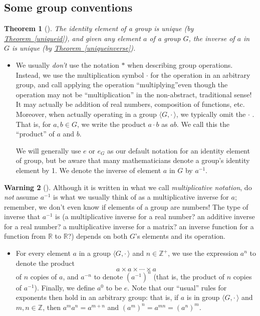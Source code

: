 \documentclass[10pt,]{book}
\theoremstyle{plain}
\newtheorem{theorem}{Theorem}[section]
\theoremstyle{definition}
\theoremstyle{definition}
\newtheorem{warning}[theorem]{Warning}
\theoremstyle{definition}
\theoremstyle{definition}
\numberwithin{equation}{section}
\def\Z{\mathbb{Z}}
\def\R{\mathbb{R}}
\def\Gdot{\langle G, \cdot\,\rangle}
\begin{document}
\subsection[{Some group conventions}]{Some group conventions}\label{subsection-1}
\begin{theorem}[{}]\label{theorem-9}
The identity element of a group is unique (by \hyperref[uniqueid]{Theorem~\ref{uniqueid}}), and given any element \(a\) of a group \(G\), the inverse of \(a\) in \(G\) is unique (by \hyperref[uniqueinverse]{Theorem~\ref{uniqueinverse}}).%
\end{theorem}
\leavevmode%
\begin{itemize}[label=\textbullet]
\item{}We usually \emph{don't} use the notation \(*\) when describing group operations. Instead, we use the multiplication symbol \(\cdot\) for the operation in an arbitrary group, and  call applying the operation ``multiplying''\textemdash{}even though the operation may not be ``multiplication'' in the non-abstract, traditional sense! It may actually be addition of real numbers, composition of functions, etc. Moreover, when actually operating in a group \(\langle G, \cdot\,\rangle\), we typically omit the \(\cdot\) . That is, for \(a,b\in G\), we write the product \(a\cdot b\) as \(ab\). We call this the ``product'' of \(a\) and \(b\).%
\par
We will generally use \(e\) or \(e_G\) as our default notation for an identity element of group, but be aware that many mathematicians denote a group's identity element by 1. We  denote the inverse of element \(a\) in \(G\) by \(a^{-1}\).%
\end{itemize}
\begin{warning}[]\label{warning-9}
Although it is written in what we call  \emph{multiplicative notation}, do \emph{not} assume \(a^{-1}\) is what we usually think of as a multiplicative inverse for \(a\); remember, we don't even know if elements of a group are numbers! The type of inverse that \(a^{-1}\) is (a multiplicative inverse for a real number? an additive inverse for a real number? a multiplicative inverse for a matrix? an inverse function for a function from \(\R\) to \(\R\)?) depends on both \(G\)'s elements and its operation.%
\end{warning}
\leavevmode%
\begin{itemize}[label=\textbullet]
\item{}For every element \(a\) in a group \(\Gdot\) and \(n\in \Z^+\), we use the expression \(a^n\) to denote  the product%
\begin{equation*}
a \times a \times \cdots \times a
\end{equation*}
of \(n\) copies of \(a\), and \(a^{-n}\) to denote \((a^{-1})^n\) (that is, the product of \(n\) copies of \(a^{-1}\)). Finally, we define \(a^0\) to be \(e\).  Note that our ``usual'' rules for exponents then hold in an arbitrary group: that is, if \(a\) is in group \(\langle G, \cdot\,\rangle\) and \(m,n\in \Z\), then \(a^m a^n = a^{m+n}\) and \((a^m)^n=a^{mn}=(a^n)^m\).%
\end{itemize}
\end{document}
